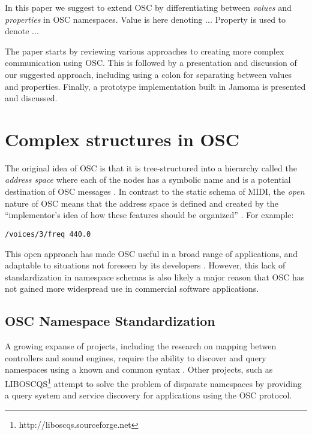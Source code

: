 \documentclass{NIME-alternate}
\begin{document}
In this paper we suggest to extend OSC by differentiating between \emph{values} and \emph{properties} in OSC namespaces. Value is here denoting ... Property is used to denote ...

The paper starts by reviewing various approaches to creating more complex communication using OSC. This is followed by a presentation and discussion of our suggested approach, including using a colon for separating between values and properties. Finally, a prototype implementation built in Jamoma is presented and discussed. 





\section{Complex structures in OSC} %
\label{sec:representing_complex_structures_in_an_OSC_namespace}


The original idea of OSC is that it is tree-structured into a hierarchy called the \emph{address space} where each of the nodes has a symbolic name and is a potential destination of OSC messages \cite{Wright:1997}. In contrast to the static schema of MIDI, the \emph{open} nature of OSC means that the address space is defined and created by the ``implementor’s idea of how these features should be organized'' \cite[p153]{Wright:2003}. For example: 

\noindent
\texttt{/voices/3/freq 440.0}

This open approach has made OSC useful in a broad range of applications, and adaptable to situations not foreseen by its developers \cite{Wright:2005}.  However, this lack of standardization in namespace schemas is also likely a major reason that OSC has not gained more widespread use in commercial software applications.



\subsection{OSC Namespace Standardization}

A growing expanse of projects, including the research on mapping betwen controllers and sound engines, require the ability to discover and query namespaces using a known and common syntax \cite{Malloch:2007}. Other projects, such as LIBOSCQS\footnote{http://liboscqs.sourceforge.net} attempt to solve the problem of disparate namespaces by providing a query system and service discovery for applications using the OSC protocol\cite{Habets:2005}\cite{Schmeder:2004oscqs}.
\end{document}
